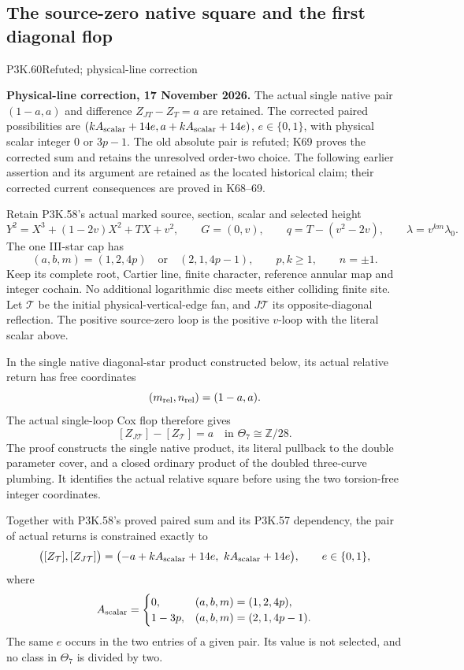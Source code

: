 \subsection{The source-zero native square and the first diagonal flop}
\begin{statement}{P3K.60}{Refuted; physical-line correction}\par\noindent\textbf{Physical-line correction, 17 November 2026.} The actual single native pair \((1-a,a)\) and difference \(Z_{JT}-Z_T=a\) are retained. The corrected paired possibilities are \((kA_{\rm scalar}+14e,a+kA_{\rm scalar}+14e)\), \(e\in\{0,1\}\), with physical scalar integer \(0\) or \(3p-1\). The old absolute pair is refuted; K69 proves the corrected sum and retains the unresolved order-two choice. The following earlier assertion and its argument are retained as the located historical claim; their corrected current consequences are proved in K68--69.\medskip\par 

Retain P3K.58's actual marked source, section, scalar and selected height
\[
 Y^2=X^3+(1-2v)X^2+TX+v^2,\qquad G=(0,v),\qquad
 q=T-(v^2-2v),\qquad \lambda=v^{km}\lambda_0 .
\]
The one III-star cap has
\[
 (a,b,m)=(1,2,4p)\quad\text{or}\quad(2,1,4p-1),
 \qquad p,k\ge1,\qquad n=\pm1 .
\]
Keep its complete root, Cartier line, finite character, reference
annular map and integer cochain. No additional logarithmic disc
meets either colliding finite site. Let \(\mathcal T\) be the initial
physical-vertical-edge fan, and \(J\mathcal T\) its opposite-diagonal
reflection. The positive source-zero loop is the positive \(v\)-loop
with the literal scalar above.

In the single native diagonal-star product constructed below, its
actual relative return has free coordinates
\[
                              (m_{\rm rel},n_{\rm rel})=(1-a,a).
\]
The actual single-loop Cox flop therefore gives
\[
                   [Z_{J\mathcal T}]-[Z_{\mathcal T}]
                                  =a\quad\text{in }\Theta_7\cong\mathbb Z/28.
\]
The proof constructs the single native product, its literal pullback
to the double parameter cover, and a closed ordinary product of
the doubled three-curve plumbing. It identifies the actual relative
square before using the two torsion-free integer coordinates.

Together with P3K.58's proved paired sum and its P3K.57 dependency,
the pair of actual returns is constrained exactly to
\[
 \bigl([Z_{\mathcal T}],[Z_{J\mathcal T}]\bigr)
   =\bigl(-a+kA_{\rm scalar}+14e,\ kA_{\rm scalar}+14e\bigr),
       \qquad e\in\{0,1\},
\]
where
\[
 A_{\rm scalar}=
 \begin{cases}
 0,&(a,b,m)=(1,2,4p),\\
 1-3p,&(a,b,m)=(2,1,4p-1).
 \end{cases}
\]
The same \(e\) occurs in the two entries of a given pair. Its value
is not selected, and no class in \(\Theta_7\) is divided by two.
\end{statement}
